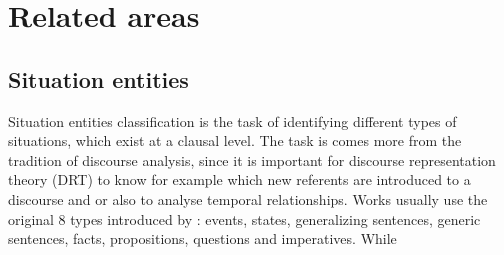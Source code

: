 \section{Related areas}
\subsection{Situation entities}
Situation entities classification is the task of identifying different types of situations, which exist at a clausal level. The task is comes more from the tradition of discourse analysis, since it is important for discourse representation theory (DRT) to know for example which new referents are introduced to a discourse and or also to analyse temporal relationships. Works usually use the original 8 types introduced by \citet{Smith_2003}: events, states, generalizing sentences, generic sentences, facts, propositions, questions and imperatives. While 